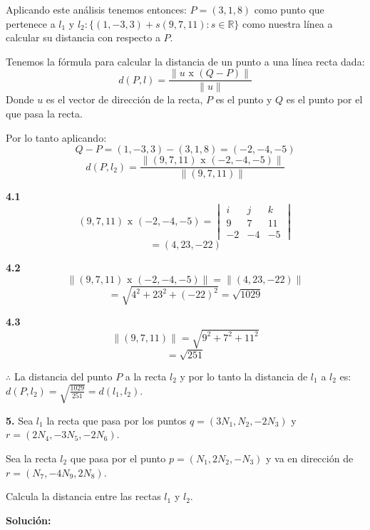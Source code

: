 \documentclass{article}
\begin{document}
Aplicando este análisis tenemos entonces: $P = (3, 1, 8)$ como punto que pertenece a $l_1$ y $l_2: \{(1,-3,3)+s(9,7,11): s \in \mathbb{R}\}$ como nuestra línea a calcular
su distancia con respecto a $P$.


Tenemos la fórmula para calcular la distancia de un punto a una línea recta dada:
$$d (P, l) = \frac{\|u \text{ x } (Q-P)\|}{\|u\|}$$
Donde $u$ es el vector de dirección de la recta, $P$ es el punto y $Q$ es el punto por el que pasa la recta.


Por lo tanto aplicando:
$$Q-P = (1,-3,3)-(3,1,8) =(-2, -4, -5)$$
$$d (P, l_2) = \frac{\|(9,7,11) \text{ x } (-2,-4,-5)\|}{\|(9,7,11)\|}$$


\begin{minipage}[c]{0.5cm}
   \textbf{4.1}
   $$(9,7,11) \text{ x } (-2,-4,-5) =\begin{vmatrix}
       i & j & k \\
       9 & 7 & 11 \\
       -2 & -4 & -5
   \end{vmatrix}$$
   $$=(4, 23, -22)$$
\end{minipage}\hspace*{7cm}\begin{minipage}[c]{0.5cm}
   \textbf{4.2}
   $$\|(9,7,11) \text{ x } (-2,-4,-5)\| = \|(4,23,-22)\|$$
   $$=\sqrt{4^2+23^2+(-22)^2} = \sqrt{1029}$$
\end{minipage}
\vspace*{20pt}


\begin{minipage}[c]{0.5cm}
   \textbf{4.3}
   $$\|(9,7,11)\| = \sqrt{9^2+7^2+11^2}$$
   $$=\sqrt{251}$$
\end{minipage}
\vspace*{20pt}


$\therefore$ La distancia del punto $P$ a la recta $l_2$ y por lo tanto la distancia de $l_1$ a $l_2$ es: $d(P,l_2)=\sqrt{\frac{1029}{251}}=d(l_1,l_2)$.
\vspace{10pt}


\textbf{5.} Sea $l_1$ la recta que pasa por los puntos $q = (3N_1, N_2, -2N_3)$ y $r = (2N_4, -3N_5, -2N_6)$.


Sea la recta $l_2$ que pasa por el punto $p = (N_1, 2N_2, -N_3)$ y va en dirección de $r =(N_7, -4N_9,2N_8)$.


Calcula la distancia entre las rectas $l_1$ y $l_2$.
\vspace{10pt}


\textbf{Solución:}
\vspace{10pt}
\end{document}
